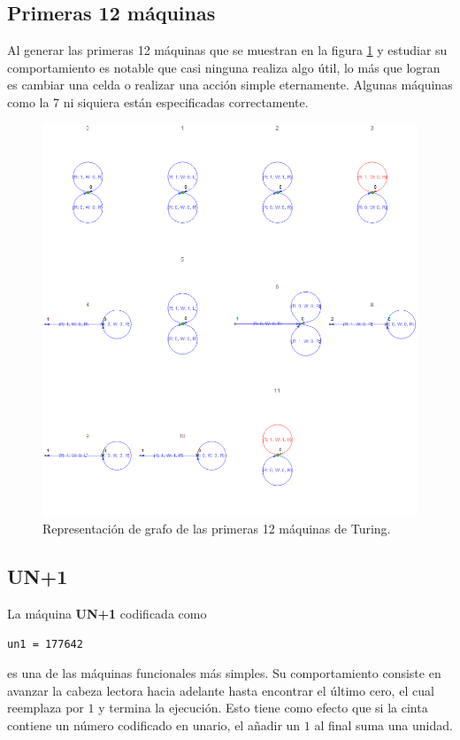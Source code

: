 \documentclass[10pt,a4paper]{article}
\begin{document}
\subsection{Primeras 12 máquinas}
Al generar las primeras 12 máquinas que se muestran en la figura \ref{fig:first12} y estudiar su comportamiento es notable que casi ninguna realiza algo útil, lo más que logran es cambiar una celda o realizar una acción simple eternamente. Algunas máquinas como la 7 ni siquiera están especificadas correctamente.

\begin{figure}[h!tb!]
	\centering
	\includegraphics[scale=0.48]{../img/first10}
	\caption{Representación de grafo de las primeras 12 máquinas de Turing.}
	\label{fig:first12}
\end{figure}

\clearpage

\subsection{UN+1}
La máquina \textbf{UN+1} codificada como
\begin{lstlisting}
un1 = 177642
\end{lstlisting}
es una de las máquinas funcionales más simples. Su comportamiento consiste en avanzar la cabeza lectora hacia adelante hasta encontrar el último cero, el cual reemplaza por $1$ y termina la ejecución. Esto tiene como efecto que si la cinta contiene un número codificado en unario, el añadir un $1$ al final suma una unidad.
\end{document}
